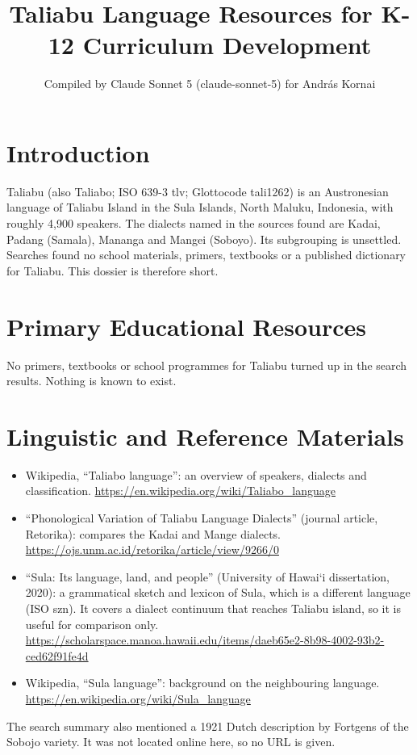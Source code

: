\documentclass[12pt]{article}
\title{Taliabu Language Resources for K-12 Curriculum Development}
\author{Compiled by Claude Sonnet 5 (claude-sonnet-5) for Andr\'as Kornai}
\date{}
\begin{document}
\maketitle

\section{Introduction}
Taliabu (also Taliabo; ISO 639-3 tlv; Glottocode tali1262) is an Austronesian language of Taliabu Island in the Sula Islands, North Maluku, Indonesia, with roughly 4,900 speakers. The dialects named in the sources found are Kadai, Padang (Samala), Mananga and Mangei (Soboyo). Its subgrouping is unsettled. Searches found no school materials, primers, textbooks or a published dictionary for Taliabu. This dossier is therefore short.

\section{Primary Educational Resources}
No primers, textbooks or school programmes for Taliabu turned up in the search results. Nothing is known to exist.

\section{Linguistic and Reference Materials}
\begin{itemize}
\item Wikipedia, ``Taliabo language'': an overview of speakers, dialects and classification. \url{https://en.wikipedia.org/wiki/Taliabo_language}
\item ``Phonological Variation of Taliabu Language Dialects'' (journal article, Retorika): compares the Kadai and Mange dialects. \url{https://ojs.unm.ac.id/retorika/article/view/9266/0}
\item ``Sula: Its language, land, and people'' (University of Hawai\textquoteleft i dissertation, 2020): a grammatical sketch and lexicon of Sula, which is a different language (ISO szn). It covers a dialect continuum that reaches Taliabu island, so it is useful for comparison only. \url{https://scholarspace.manoa.hawaii.edu/items/daeb65e2-8b98-4002-93b2-ced62f91fe4d}
\item Wikipedia, ``Sula language'': background on the neighbouring language. \url{https://en.wikipedia.org/wiki/Sula_language}
\end{itemize}
The search summary also mentioned a 1921 Dutch description by Fortgens of the Sobojo variety. It was not located online here, so no URL is given.
\end{document}

